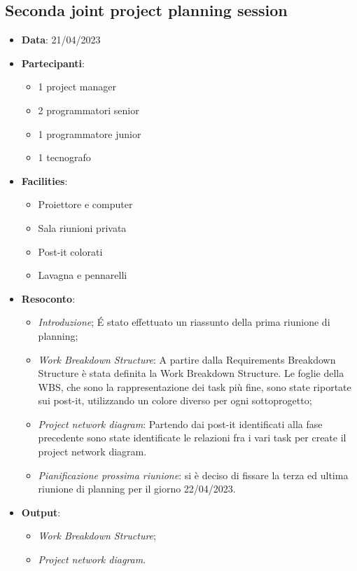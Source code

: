 \documentclass{article}
\begin{document}
  \subsection{Seconda joint project planning session}
  \begin{itemize}
    \item \textbf{Data}: 21/04/2023
    \item \textbf{Partecipanti}:
    \begin{itemize}
      \item 1 project manager
      \item 2 programmatori senior
      \item 1 programmatore junior
      \item 1 tecnografo
    \end{itemize}
    \item \textbf{Facilities}:
    \begin{itemize}
      \item Proiettore e computer
      \item Sala riunioni privata
      \item Post-it colorati
      \item Lavagna e pennarelli
    \end{itemize}
    \item \textbf{Resoconto}:
    \begin{itemize}
      \item \emph{Introduzione};
        É stato effettuato un riassunto della prima riunione di planning;
      \item \emph{Work Breakdown Structure}:
        A partire dalla Requirements Breakdown Structure è stata definita la Work Breakdown Structure. 
        Le foglie della WBS, che sono la rappresentazione dei task più fine, sono state riportate sui post-it,
        utilizzando un colore diverso per ogni sottoprogetto;
      \item \emph{Project network diagram}:
        Partendo dai post-it identificati alla fase precedente sono state identificate le relazioni fra i 
        vari task per create il project network diagram.
      \item \emph{Pianificazione prossima riunione}: si è deciso di fissare la terza ed ultima riunione 
        di planning per il giorno 22/04/2023.
    \end{itemize}
    \item \textbf{Output}: 
    \begin{itemize}
      \item \emph{Work Breakdown Structure};
      \item \emph{Project network diagram}.
    \end{itemize}
  \end{itemize}
\end{document}

